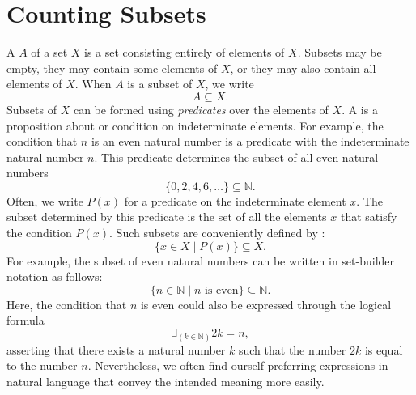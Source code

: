 \section{Counting Subsets}

A  $A$ of a set $X$ is a set consisting entirely of elements of $X$. Subsets may be empty, they may contain some elements of $X$, or they may also contain all elements of $X$. When $A$ is a subset of $X$, we write
\begin{equation*}
  A\subseteq X.
\end{equation*}
Subsets of $X$ can be formed using \emph{predicates} over the elements of $X$. A  is a proposition about or condition on indeterminate elements. For example, the condition that $n$ is an even natural number is a predicate with the indeterminate natural number $n$. This predicate determines the subset of all even natural numbers
\begin{equation*}
  \{0,2,4,6,\ldots\}\subseteq\mathbb{N}.
\end{equation*}
Often, we write $P(x)$ for a predicate on the indeterminate element $x$. The subset determined by this predicate is the set of all the elements $x$ that satisfy the condition $P(x)$. Such subsets are conveniently defined by :
\begin{equation*}
  \{x\in X\mid P(x)\}\subseteq X.
\end{equation*}
For example, the subset of even natural numbers can be written in set-builder notation as follows:
\begin{equation*}
  \{n\in\mathbb{N}\mid \text{$n$ is even}\}\subseteq\mathbb{N}.
\end{equation*}
Here, the condition that $n$ is even could also be expressed through the logical formula
\begin{equation*}
  \exists_{(k\in\mathbb{N})}2k=n,
\end{equation*}
asserting that there exists a natural number $k$ such that the number $2k$ is equal to the number $n$. Nevertheless, we often find ourself preferring expressions in natural language that convey the intended meaning more easily.


